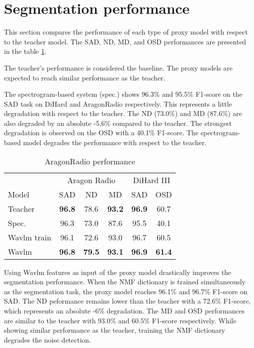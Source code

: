 \section{Segmentation performance}
\label{sect:perf}

This section compares the performance of each type of proxy model with respect to the teacher model.
The SAD, ND, MD, and OSD performances are presented in the table \ref*{tab:seg_results}.

The teacher's performance is considered the baseline.
The proxy models are expected to reach similar performance as the teacher.

The spectrogram-based system (spec.) shows 96.3\% and 95.5\% F1-score on the SAD task on DiHard and AragonRadio respectively.
This represents a little degradation with respect to the teacher.
The ND (73.0\%) and MD (87.6\%) are also degraded by an absolute -5,6\% compared to the teacher.
The strongest degradation is observed on the OSD with a 40.1\% F1-score.
The spectrogram-based model degrades the performance with respect to the teacher.

\begin{table}[ht]
    \centering
    \begin{tabular}{lccccc}
        \toprule
         & \multicolumn{3}{c}{Aragon Radio} & \multicolumn{2}{c}{DiHard III} \\
         \cmidrule{2-4}
         \cmidrule{5-6}
         Model & SAD & ND & MD & SAD & OSD \\  
         \midrule
         Teacher & \textbf{96.8} & 78.6 & \textbf{93.2} & \textbf{96.9} & 60.7\\
         \midrule
         Spec. & 96.3 & 73.0 &  87.6 & 95.5 & 40.1\\
         Wavlm train & 96.1 & 72.6 & 93.0 & 96.7 & 60.5\\
         Wavlm & \textbf{96.8} & \textbf{79.5} & \textbf{93.1} & \textbf{96.9} & \textbf{61.4} \\
         \bottomrule
    \end{tabular}
    \caption{AragonRadio performance}
    \label{tab:seg_results}
\end{table}

Using Wavlm features as input of the proxy model drastically improves the segmentation performance.
When the NMF dictionary is trained simultaneously as the segmentation task, the proxy model reaches 96.1\% and 96.7\% F1-score on SAD.
The ND peformance remains lower than the teacher with a 72.6\% F1-score, which represents an absolute -6\% degradation.
The MD and OSD performances are similar to the teacher with 93.0\% and 60.5\% F1-score respectively.
While showing similar performance as the teacher, training the NMF dictionary degrades the noise detection.

